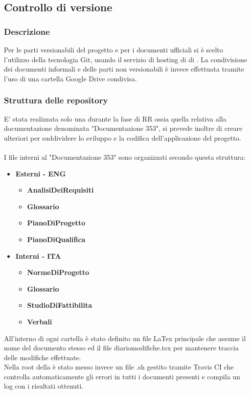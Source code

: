 \documentclass[NormeDiProgetto.tex]{subfiles}
\begin{document}
	\subsection{Controllo di versione}
	
	\subsubsection{Descrizione}
	Per le parti versionabili del progetto e per i documenti ufficiali si è scelto l'utilizzo della tecnologia Git, usando il servizio di hosting di  di .
	La condivisione dei documenti informali e delle parti non versionabili è invece effettuata tramite l'uso di una cartella Google Drive condivisa.
	
	\subsubsection{Struttura delle repository}
	E' stata realizzata solo una  durante la fase di RR ossia quella relativa alla documentazione denominata "Documentazione 353", si prevede inoltre di creare ulteriori  per suddividere lo sviluppo e la codifica dell'applicazione del progetto. \\\\
	I file interni al  "Documentazione 353" sono organizzati secondo questa struttura:
	\begin{itemize}
		\item \textbf{Esterni - ENG}
				\begin{itemize}
				\item \textbf{AnalisiDeiRequisiti}
				\item \textbf{Glossario}
				\item \textbf{PianoDiProgetto}
				\item \textbf{PianoDiQualifica}
			\end{itemize}
		\item \textbf{Interni - ITA}
				\begin{itemize}
					\item \textbf{NormeDiProgetto}
					\item \textbf{Glossario}
					\item \textbf{StudioDiFattibilita}
					\item \textbf{Verbali}
				\end{itemize}		
	\end{itemize}	
	All'interno di ogni cartella è stato definito un file LaTex principale che assume il nome del documento stesso ed il file diariomodifiche.tex per mantenere traccia delle modifiche effettuate.\\
	Nella root della  è stato messo invece un file .sh gestito tramite Travis CI che controlla automaticamente gli errori in tutti i documenti presenti e compila un log con i risultati ottenuti.
	
\end{document}
